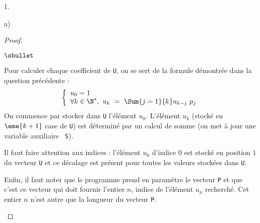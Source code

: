 \documentclass[11pt]{article}%
\begin{document}
\begin{noliste}{1.}
\begin{noliste}{a)}
\begin{proof}
\begin{noliste}{$\sbullet$}
    \item Pour calculer chaque coefficient de {\tt U}, on se sert de
      la formule démontrée dans la question précédente :
      \[
      \left\{
        \begin{array}{l}
          u_0 = 1 \\%
          \forall k \in \N^*, \ u_k \ = \ \Sum{j = 1}{k} u_{k-j} \ p_j
        \end{array}
        \right.
      \]
      On commence par stocker dans {\tt U} l'élément $u_0$. L'élément
      $u_k$ (stocké en $\eme{k+1}$ case de {\tt U}) est déterminé par
      un calcul de somme (on met à jour une variable auxiliaire {\tt
        S}).


      \newpage


    \item Il faut faire attention aux indices : l'élément $u_0$ d'indice $0$
      est stocké en position $1$ du vecteur {\tt U} et ce décalage est
      présent pour toutes les valeurs stockées dans {\tt U}.

    \item Enfin, il faut noter que le programme prend en paramètre le
      vecteur {\tt P} et que c'est ce vecteur qui doit fournir
      l'entier $n$, indice de l'élément $u_n$ recherché. Cet entier
      $n$ n'est autre que la longueur du vecteur {\tt P}.
      

\end{noliste}
\end{proof}
\end{noliste}
\end{noliste}
\end{document}
